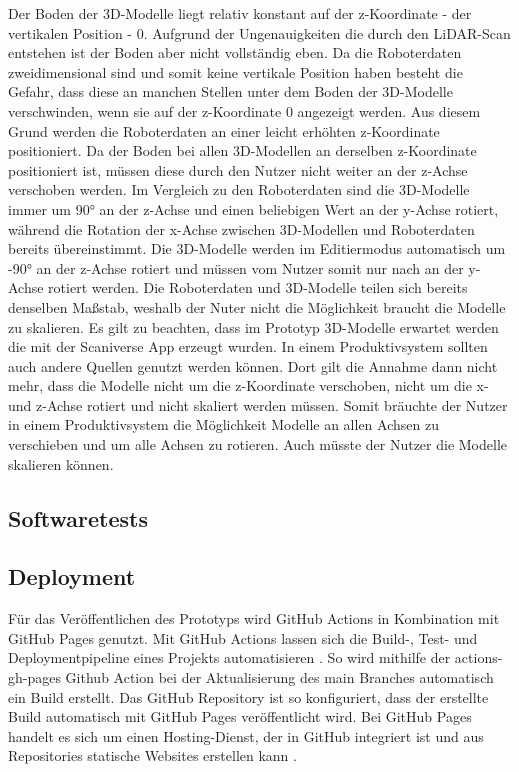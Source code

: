 Der Boden der 3D-Modelle liegt relativ konstant auf der z-Koordinate - der vertikalen Position - 0. Aufgrund der Ungenauigkeiten die durch den \ac{LiDAR}-Scan entstehen ist der Boden aber nicht vollständig eben. Da die Roboterdaten zweidimensional sind und somit keine vertikale Position haben besteht die Gefahr, dass diese an manchen Stellen unter dem Boden der 3D-Modelle verschwinden, wenn sie auf der z-Koordinate 0 angezeigt werden. Aus diesem Grund werden die Roboterdaten an einer leicht erhöhten z-Koordinate positioniert. Da der Boden bei allen 3D-Modellen an derselben z-Koordinate positioniert ist, müssen diese durch den Nutzer nicht weiter an der z-Achse verschoben werden. Im Vergleich zu den Roboterdaten sind die 3D-Modelle immer um 90° an der z-Achse und einen beliebigen Wert an der y-Achse rotiert, während die Rotation der x-Achse zwischen 3D-Modellen und Roboterdaten bereits übereinstimmt. Die 3D-Modelle werden im Editiermodus automatisch um -90° an der z-Achse rotiert und müssen vom Nutzer somit nur nach an der y-Achse rotiert werden. Die Roboterdaten und 3D-Modelle teilen sich bereits denselben Maßstab, weshalb der Nuter nicht die Möglichkeit braucht die Modelle zu skalieren. Es gilt zu beachten, dass im Prototyp 3D-Modelle erwartet werden die mit der Scaniverse App erzeugt wurden. In einem Produktivsystem sollten auch andere Quellen genutzt werden können. Dort gilt die Annahme dann nicht mehr, dass die Modelle nicht um die z-Koordinate verschoben, nicht um die x- und z-Achse rotiert und nicht skaliert werden müssen. Somit bräuchte der Nutzer in einem Produktivsystem die Möglichkeit Modelle an allen Achsen zu verschieben und um alle Achsen zu rotieren. Auch müsste der Nutzer die Modelle skalieren können.

\subsection{Softwaretests}

\subsection{Deployment}
Für das Veröffentlichen des Prototyps wird GitHub Actions in Kombination mit GitHub Pages genutzt. Mit GitHub Actions lassen sich die Build-, Test- und Deploymentpipeline eines Projekts automatisieren \cite{GitHubActions}. So wird mithilfe der actions-gh-pages Github Action 
bei der Aktualisierung des main Branches automatisch ein Build erstellt. Das GitHub Repository ist so konfiguriert, dass der erstellte Build automatisch mit GitHub Pages veröffentlicht wird. Bei GitHub Pages handelt es sich um einen Hosting-Dienst, der in GitHub integriert ist und aus Repositories statische Websites erstellen kann \cite{GitHubPages}.

